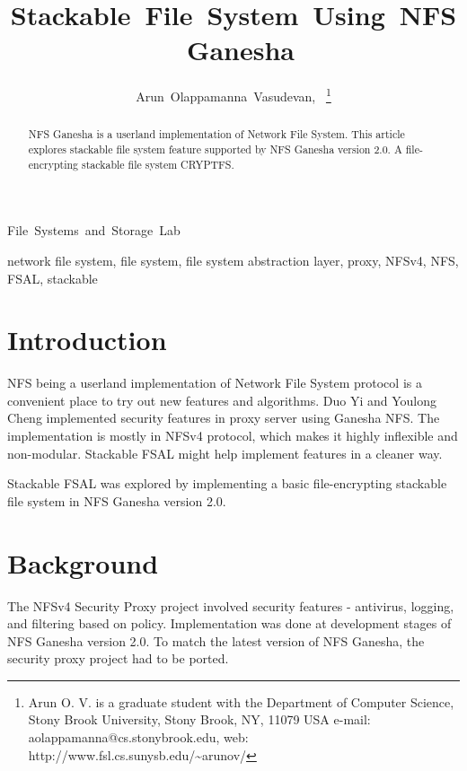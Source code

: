 \documentclass[10pt, journal, twocolumn, twoside]{IEEEtran}
\begin{document}
\title{Stackable~File~System~Using~NFS~Ganesha}

\author{Arun~Olappamanna~Vasudevan,~
\thanks{Arun O. V. is a graduate student with the Department
of Computer Science, Stony Brook University, Stony Brook,
NY, 11079 USA e-mail: aolappamanna@cs.stonybrook.edu,
web: http://www.fsl.cs.sunysb.edu/\~{}arunov/}}%

%
{File~Systems~and~Storage~Lab}

\maketitle

\begin{abstract}
NFS Ganesha is a userland implementation of Network File System. This article
explores stackable file system feature supported by NFS Ganesha version 2.0.
A file-encrypting stackable file system CRYPTFS.
\end{abstract}

\begin{IEEEkeywords}
network file system, file system, file system abstraction layer, proxy,
NFSv4, NFS, FSAL, stackable
\end{IEEEkeywords}

\IEEEpeerreviewmaketitle

\section{Introduction}
 NFS being a userland implementation of Network File
System protocol is a convenient place to try out new features and algorithms.
Duo Yi and Youlong Cheng implemented security features in proxy server
\cite{NFSv4SecurityProxy} using Ganesha NFS. The implementation is mostly in
NFSv4 protocol, which makes it highly inflexible and non-modular. Stackable
FSAL might help implement features in a cleaner way.

Stackable FSAL was explored by implementing a basic file-encrypting
stackable file system in NFS Ganesha version 2.0.

\section{Background}
The NFSv4 Security Proxy project involved security features - antivirus, logging,
and filtering based on policy. Implementation was done at development stages of
NFS Ganesha version 2.0. To match the latest version of NFS Ganesha, the security proxy project
had to be ported.
\end{document}
